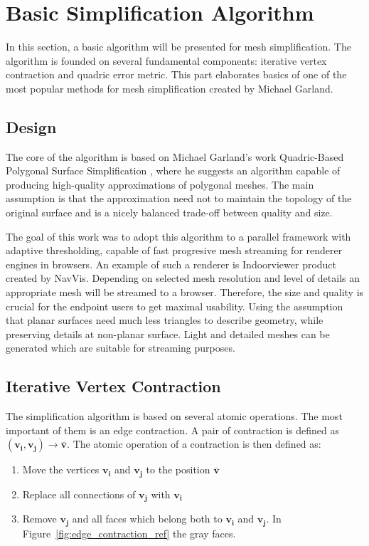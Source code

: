 \chapter{Basic Simplification Algorithm}
\thispagestyle{empty}%
In this section, a basic algorithm will be presented for mesh simplification. The algorithm is founded on several fundamental components: iterative vertex contraction and quadric error metric. This part elaborates basics of one of the most popular methods for mesh simplification created by Michael Garland.
\section{Design}
The core of the algorithm is based on Michael Garland's work Quadric-Based Polygonal Surface Simplification \cite{garland99}, where he suggests an algorithm capable of producing high-quality approximations of polygonal meshes. The main assumption is that the approximation need not to maintain the topology of the original surface and is a nicely balanced trade-off between quality and size.

The goal of this work was to adopt this algorithm to a parallel framework with adaptive thresholding, capable of fast progresive mesh streaming \cite{yang01} for renderer engines in browsers. An example of such a renderer is Indoorviewer product created by NavVis. Depending on selected mesh resolution and level of details an appropriate mesh will be streamed to a browser. Therefore, the size and quality is crucial for the endpoint users to get maximal usability. Using the assumption that planar surfaces need much less triangles to describe geometry, while preserving details at non-planar surface. Light and detailed meshes can be generated which are suitable for streaming purposes.
\clearpage

\section{Iterative Vertex Contraction}
The simplification algorithm is based on several atomic operations. The most important of them is an edge contraction. A pair of contraction is defined as $(\mathbf{v_i}, \mathbf{v_j})\rightarrow\bar{\mathbf{v}}$. The atomic operation of a contraction is then defined as:

\begin{enumerate}
\item Move the vertices $\mathbf{v_i}$ and $\mathbf{v_j}$ to the position $\bar{\mathbf{v}}$
\item Replace all connections of $\mathbf{v_j}$ with $\mathbf{v_i}$
\item Remove $\mathbf{v_j}$ and all faces which belong both to $\mathbf{v_i}$ and $\mathbf{v_j}$. In Figure~\ref{fig:edge_contraction_ref} the gray faces.
\end{enumerate}

